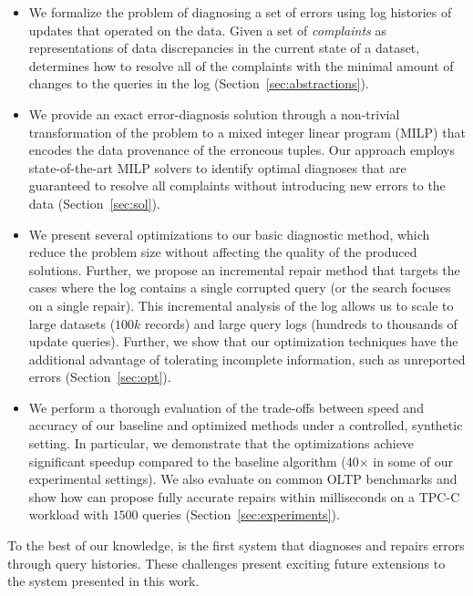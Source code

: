 \begin{itemize}[leftmargin=*, topsep=0mm, itemsep=0mm]      
    \item We formalize the problem of diagnosing a set of errors using log
    histories of updates that operated on the data. Given a set of 
    \emph{complaints} as representations of data discrepancies in the current
    state of a dataset, \sys determines how to resolve all of the complaints with the minimal amount of changes to the queries in the log (Section~\ref{sec:abstractions}).
      
    \item We provide an exact error-diagnosis solution through a non-trivial
    transformation of the problem to a mixed integer linear program (MILP) that
    encodes the data provenance of the erroneous tuples. Our approach employs state-of-the-art MILP solvers to identify
    optimal diagnoses that are guaranteed to resolve all complaints without introducing new errors to the data
    (Section~\ref{sec:sol}).
    
    \item We present several optimizations to our basic diagnostic
    method, which reduce the problem size without affecting the
    quality of the produced solutions. Further, we propose an
    incremental repair method that targets the cases where the log
    contains a single corrupted query (or the search focuses on a
    single repair). This incremental analysis of the log allows us to
    scale to large datasets ($100k$ records) and large query logs (hundreds to thousands of update queries). Further, we
    show that our optimization techniques have the additional
    advantage of tolerating incomplete information, such as unreported
    errors (Section~\ref{sec:opt}). 

    
    
    \item We perform a thorough evaluation of the trade-offs between speed and accuracy of our baseline and optimized methods under a controlled, synthetic setting. In particular, we demonstrate that the  \sys optimizations achieve significant speedup compared to the baseline algorithm (40$\times$ in some of our experimental settings).
    We also evaluate \sys on common OLTP benchmarks and show how \sys can propose fully accurate repairs within milliseconds on a TPC-C workload with $1500$ queries (Section~\ref{sec:experiments}).
\end{itemize}

To the best of our knowledge, \sys is the first system that diagnoses
and repairs errors through query histories. 
These challenges present exciting future extensions to the system presented in this work.






